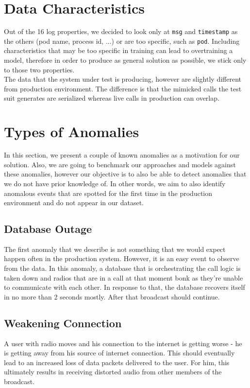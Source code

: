 \section{Data Characteristics}
Out of the 16 log properties, we decided to look only at \texttt{msg} and \texttt{timestamp} as the others (pod name, process id, ...) or are too specific, such as \texttt{pod}. 
Including characteristics that may be too specific in training can lead to overtraining a model, therefore in order to produce as general solution as possible, we stick only to those two properties.\\

The data that the system under test is producing, however are slightly different from production environment. The difference is that the mimicked calls the test suit generates are serialized whereas live calls in production can overlap. \\

\section{Types of Anomalies}
In this section, we present a couple of known anomalies as a motivation for our solution.
Also, we are going to benchmark our approaches and models against these anomalies, however our objective is to also be able to detect anomalies that we do not have prior knowledge of. 
In other words, we aim to also identify anomalous events that are spotted for the first time in the production environment and do not appear in our dataset.

\subsection{Database Outage}
The first anomaly that we describe is not something that we would expect happen often in the production system. However, it is an easy event to observe from the data. In this anomaly, a database that is orchestrating the call logic is taken down and radios that are in a call at that moment bonk as they're unable to communicate with each other. In response to that, the database recovers itself in no more than 2 seconds mostly. After that broadcast should continue.


\subsection{Weakening Connection}
A user with radio moves and his connection to the internet is getting worse - he is getting away from his source of internet connection. This should eventually lead to an increased loss of data packets delivered to the user. For him, this ultimately results in receiving distorted audio from other members of the broadcast.

